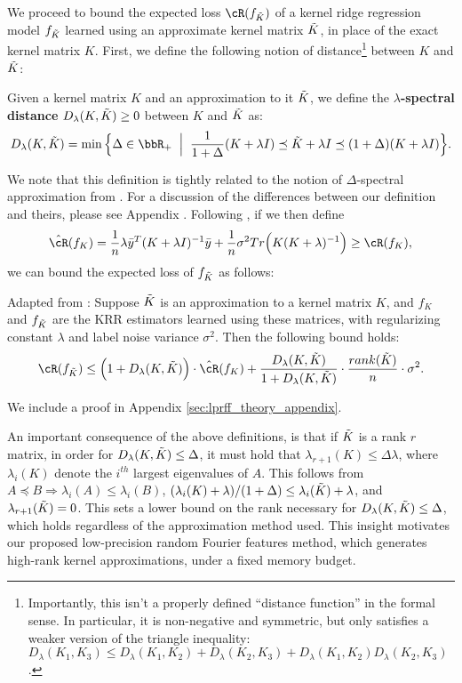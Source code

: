 We proceed to bound the expected loss $\cR(f_{\tK})$ of a kernel ridge regression model $f_{\tilde{K}}$ learned using an approximate kernel matrix $\tilde{K}$, in place of the exact kernel matrix $K$. First, we define the following notion of distance\footnote{Importantly, this isn't a properly defined ``distance function'' in the formal sense.  In particular, it is non-negative and symmetric, but only satisfies a weaker version of the triangle inequality: $D_{\lambda}(K_1,K_3) \leq D_{\lambda}(K_1,K_2) + D_{\lambda}(K_2,K_3) + D_{\lambda}(K_1,K_2)D_{\lambda}(K_2,K_3)$.} between $K$ and $\tilde{K}$:

\begin{definition}
	Given a kernel matrix $K$ and an approximation to it $\tilde{K}$, we define the \textbf{$\lambda$-spectral distance} $D_{\lambda}(K,\tilde{K})\geq 0$ between $K$ and $\tilde{K}$ as:
	$$D_{\lambda}(K,\tK) = \min \Big\{\Delta \in \RR_{+} \;\;\Big|\;\; \frac{1}{1+\Delta}(K+\lambda I) \preceq \tK + \lambda I \preceq (1+\Delta)(K+\lambda I)\Big\}.$$
\end{definition}

We note that this definition is tightly related to the notion of $\Delta$-spectral approximation from \citet{avron17}.  For a discussion of the differences between our definition and theirs, please see Appendix . Following \citet{avron17}, if we then define 
$$\hcR(f_K) = \frac{1}{n}\lambda \by^T(K+\lambda I)^{-1}\by + \frac{1}{n}\sigma^2 Tr\Big(K(K+\lambda)^{-1}\Big) \geq \cR(f_K),$$ 
we can bound the expected loss of $f_{\tilde{K}}$ as follows:

\begin{proposition}{Adapted from \citep{avron17}:}
	\label{prop:avron}
	Suppose $\tilde{K}$ is an approximation to a kernel matrix $K$, and $f_{K}$ and $f_{\tilde{K}}$ are the KRR estimators learned using these matrices, with regularizing constant $\lambda$ and label noise variance $\sigma^2$. Then the following bound holds:
	\begin{eqnarray}
	\cR(f_{\tK}) \leq \Big(1+D_{\lambda}(K,\tK)\Big)\cdot \hcR(f_K) + \frac{D_{\lambda}(K,\tK)}{1+D_{\lambda}(K,\tK)}\cdot \frac{rank(\tK)}{n}\cdot\sigma^2.
	\end{eqnarray}
\end{proposition}
We include a proof in Appendix \ref{sec:lprff_theory_appendix}. 

An important consequence of the above definitions, is that if $\tilde{K}$ is a rank $r$ matrix, in order for $D_{\lambda}(K,\tilde{K}) \leq \Delta$, it must hold that $\lambda_{r+1}(K) \leq \Delta \lambda$, where $\lambda_i(K)$ denote the $i^{th}$ largest eigenvalues of $A$.  This follows from $A\preceq B \Rightarrow \lambda_i(A) \leq \lambda_i(B)$, $(\lambda_i(K) + \lambda)/(1+\Delta) \leq \lambda_i(\tilde{K}) + \lambda$, and $\lambda_{r+1}(\tilde{K}) = 0$.  This sets a lower bound on the rank necessary for $D_{\lambda}(K,\tilde{K}) \leq \Delta$, which holds regardless of the approximation method used. This insight motivates our proposed low-precision random Fourier features method, which generates high-rank kernel approximations, under a fixed memory budget.